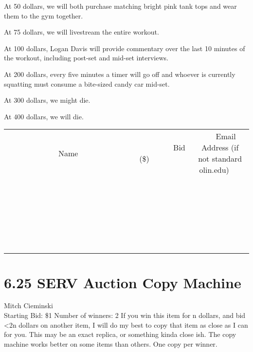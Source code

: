 \documentclass[11pt]{article}
\begin{document}
At 50 dollars, we will both purchase matching bright pink tank tops and wear them to the gym together.

At 75 dollars, we will livestream the entire workout.

At 100 dollars, Logan Davis will provide commentary over the last 10 minutes of the workout, including post-set and mid-set interviews.

At 200 dollars, every five minutes a timer will go off and whoever is currently squatting must consume a bite-sized candy car mid-set.

At 300 dollars, we might die.

At 400 dollars, we will die.
\\[6ex]
\begin{tabular}{c c c}
~~~~~~~~~~~~~Name~~~~~~~~~~~~~ & ~~~~~~~~~Bid (\$)~~~~~~~~~  & ~~~Email Address (if not standard olin.edu)~~~\\
 & & \\
\hline
 & & \\
\hline
 & & \\
\hline
 & & \\
\hline
 & & \\
\hline
 & & \\
\hline
 & & \\
\hline
 & & \\
\hline
 & & \\
\hline
 & & \\
\hline
 & & \\
\hline
 & & \\
\hline
 & & \\
\hline
 & & \\
\hline
 & & \\
\hline
 & & \\
\hline
 & & \\
\hline
 & & \\
\hline
 & & \\
\hline
 & & \\
\hline
 & & \\
\hline
 & & \\
\hline
 & & \\
\hline
 & & \\
\hline
 & & \\
\hline
 & & \\
\hline
\end{tabular}
\newpage
\section*{6.25 SERV Auction Copy Machine}
Mitch Cieminski
\\
Starting Bid: \$1
\newline
Number of winners: 2
\newline
If you win this item for n dollars, and bid \textless 2n dollars on another item, I will do my best to copy that item as close as I can for you. This may be an exact replica, or something kinda close ish. The copy machine works better on some items than others. One copy per winner.
\end{document}
